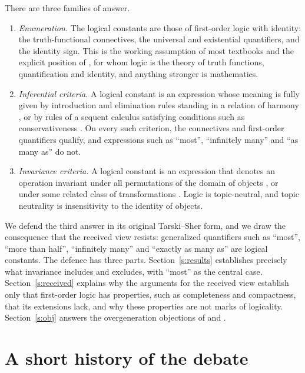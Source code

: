 \documentclass{situationist-preprint}
\begin{document}
There are three families of answer.

\begin{enumerate}[label=(\roman*)]
\item \emph{Enumeration.} The logical constants are those of first-order logic with identity: the truth-functional connectives, the universal and existential quantifiers, and the identity sign. This is the working assumption of most textbooks and the explicit position of \citet{Quine1970}, for whom logic is the theory of truth functions, quantification and identity, and anything stronger is mathematics.
\item \emph{Inferential criteria.} A logical constant is an expression whose meaning is fully given by introduction and elimination rules standing in a relation of harmony \citep{Gentzen1935,Prawitz1965,Dummett1991}, or by rules of a sequent calculus satisfying conditions such as conservativeness \citep{Hacking1979}. On every such criterion, the connectives and first-order quantifiers qualify, and expressions such as \enquote{most}, \enquote{infinitely many} and \enquote{as many as} do not.
\item \emph{Invariance criteria.} A logical constant is an expression that denotes an operation invariant under all permutations of the domain of objects \citep{Tarski1986,Sher1991}, or under some related class of transformations \citep{McGee1996,Feferman1999,Bonnay2008}. Logic is topic-neutral, and topic neutrality is insensitivity to the identity of objects.
\end{enumerate}

We defend the third answer in its original Tarski--Sher form, and we draw the consequence that the received view resists: generalized quantifiers such as \enquote{most}, \enquote{more than half}, \enquote{infinitely many} and \enquote{exactly as many as} are logical constants. The defence has three parts. Section~\ref{s:results} establishes precisely what invariance includes and excludes, with \enquote{most} as the central case. Section~\ref{s:received} explains why the arguments for the received view establish only that first-order logic has properties, such as completeness and compactness, that its extensions lack, and why these properties are not marks of logicality. Section~\ref{s:obj} answers the overgeneration objections of \citet{McGee1996} and \citet{Feferman1999}.

\section{A short history of the debate}\label{s:history}
\end{document}
